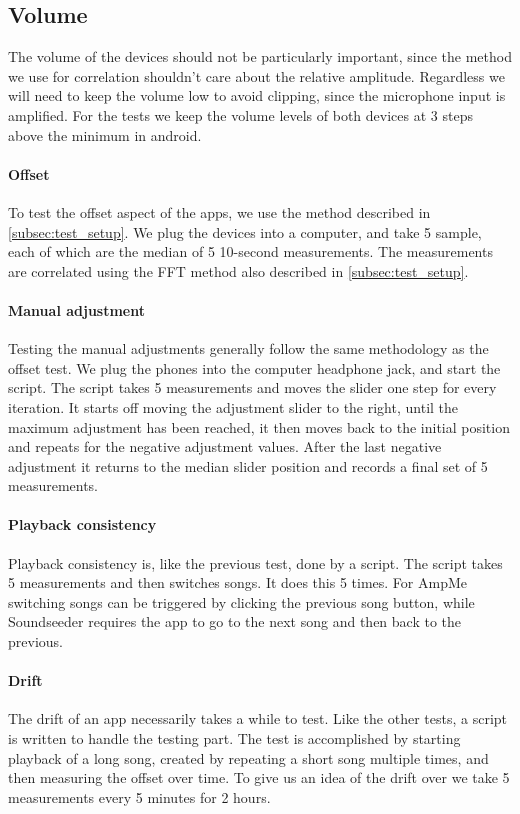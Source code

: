 \subsection{Volume}
The volume of the devices should not be particularly important, since
the method we use for correlation shouldn't care about the relative
amplitude. Regardless we will need to keep the volume low to avoid
clipping, since the microphone input is amplified. For the tests we keep
the volume levels of both devices at 3 steps above the minimum in
android.

\paragraph{Offset}
To test the offset aspect of the apps, we use the method described in
\cref{subsec:test_setup}. We plug the devices into a computer, and take
5 sample, each of which are the median of 5 10-second measurements. The
measurements are correlated using the \ac{FFT} method also described in
\cref{subsec:test_setup}.

\paragraph{Manual adjustment}
Testing the manual adjustments generally follow the same methodology as
the offset test. We plug the phones into the computer headphone jack,
and start the script. The script takes 5 measurements and moves the
slider one step for every iteration. It starts off moving the adjustment
slider to the right, until the maximum adjustment has been reached, it
then moves back to the initial position and repeats for the negative
adjustment values. After the last negative adjustment it returns to the
median slider position and records a final set of 5 measurements.

\paragraph{Playback consistency}
Playback consistency is, like the previous test, done by a script. The
script takes 5 measurements and then switches songs. It does this
5 times.  For AmpMe switching songs can be triggered by clicking the
previous song button, while Soundseeder requires the app to go to the
next song and then back to the previous.

\paragraph{Drift}
The drift of an app necessarily takes a while to test. Like the other
tests, a script is written to handle the testing part. The test is
accomplished by starting playback of a long song, created by repeating
a short song multiple times, and then measuring the offset over time. To
give us an idea of the drift over we take 5 measurements every 5 minutes
for 2 hours.
